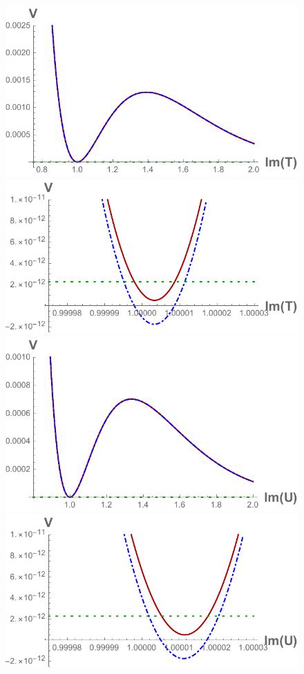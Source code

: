 \documentclass[a4paper,12pt,twoside,openright]{report}
\begin{document}
\begin{figure}[H]
\includegraphics[scale=0.55]{quevedo_38_T_large.pdf}\qquad\includegraphics[scale=0.59]{quevedo_38_T_close.pdf}\\
\includegraphics[scale=0.55]{quevedo_38_U_large.pdf}\qquad\includegraphics[scale=0.59]{quevedo_38_U_close.pdf}

\end{figure}
\end{document}
